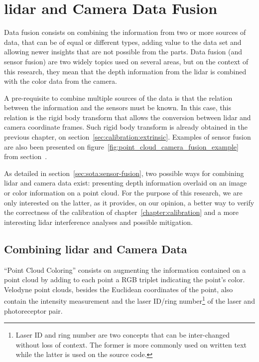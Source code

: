 \chapter{\ac{lidar} and Camera Data Fusion}
\label{chapter:sensor_fusion}

Data fusion consists on combining the information from two or more sources of data, that can be of equal or different types, adding value to the data set and allowing newer insights that are not possible from the parts. Data fusion (and sensor fusion) are two widely topics used on several areas, but on the context of this research, they mean that the depth information from the \ac{lidar} is combined with the color data from the camera.

A pre-requisite to combine multiple sources of the data is that the relation between the information and the sensors must be known. In this case, this relation is the rigid body transform that allows the conversion between \ac{lidar} and camera coordinate frames. Such rigid body transform is already obtained in the previous chapter, on section~\ref{sec:calibration:extrinsic}. Examples of sensor fusion are also been presented on figure~\ref{fig:point_cloud_camera_fusion_example} from section~.

As detailed in section~\ref{sec:sota:sensor-fusion}, two possible ways for combining \ac{lidar} and camera data exist: presenting depth information overlaid on an image or color information on a point cloud. For the purpose of this research, we are only interested on the latter, as it provides, on our opinion, a better way to verify the correctness of the calibration of chapter~\ref{chapter:calibration} and a more interesting \ac{lidar} interference analyses and possible mitigation.

\section{Combining \ac{lidar} and Camera Data}
``Point Cloud Coloring'' consists on augmenting the information contained on a point cloud by adding to each point a RGB triplet indicating the point's color. Velodyne point clouds, besides the Euclidean coordinates of the point, also contain the intensity measurement and the laser ID/ring number\footnote{Laser ID and ring number are two concepts that can be inter-changed without loss of context. The former is more commonly used on written text while the latter is used on the source code.} of the laser and photoreceptor pair.

